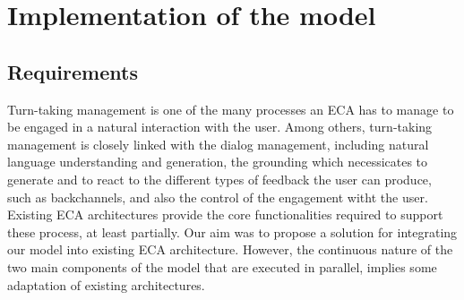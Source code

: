 \section{Implementation of the model}
\label{impl}

\subsection{Requirements}

Turn-taking management is one of the many processes an ECA has to manage to be engaged in a natural interaction with the user. 
Among others, turn-taking management is closely linked with 
the dialog management, including natural language understanding and generation, 
the grounding which necessicates to generate and to react to the different types of feedback the user can produce, such as backchannels, 
and also the control of the engagement witht the user. 
Existing ECA architectures provide the core functionalities required to support these process, at least partially. 
Our aim was to propose a solution for integrating our model into existing ECA architecture.
However, the continuous nature of the two main components of the model that are executed in parallel, implies some adaptation of existing architectures. 




